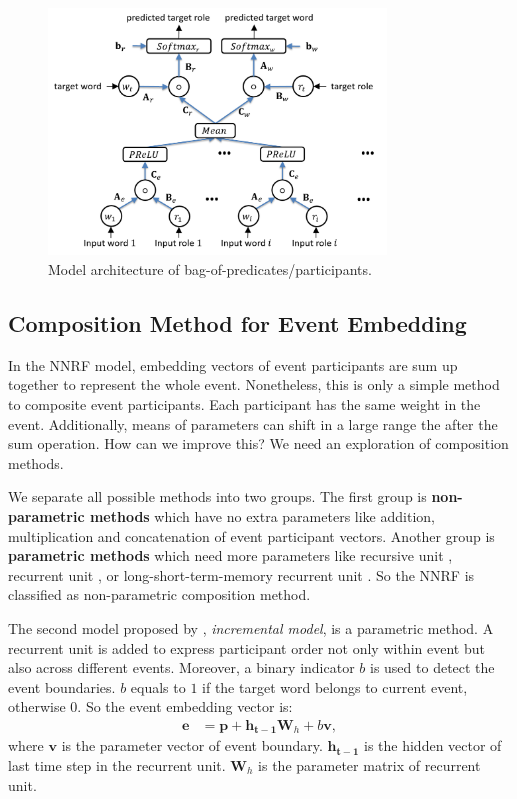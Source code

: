 \documentclass[a4paper]{article}
\begin{document}
\begin{figure}[t]
\centering
\includegraphics[width=0.8\textwidth]{BOP.png}
\caption{\label{fig:BOP} Model architecture of bag-of-predicates/participants.}
\end{figure}


\subsection{Composition Method for Event Embedding} \label{sec:composition}
In the NNRF model, embedding vectors of event participants are sum up together to represent the whole event. Nonetheless, this is only a simple method to composite event participants. Each participant has the same weight in the event. Additionally, means of parameters can shift in a large range the after the sum operation. How can we improve this? We need an exploration of composition methods. 

We separate all possible methods into two groups. The first group is \textbf{non-parametric methods} which have no extra parameters like addition, multiplication and concatenation of event participant vectors. Another group is \textbf{parametric methods} which need more parameters like recursive unit \citep{socher2013recursive}, recurrent unit \citet{mikolov2010recurrent}, or long-short-term-memory recurrent unit \citep{hochreiter1997LSTM}. So the NNRF is classified as non-parametric composition method. 

The second model proposed by \citet{tilk2016event}, \textit{incremental model}, is a parametric method. A recurrent unit is added to express participant order not only within event but also across different events. Moreover, a binary indicator $b$ is used to detect the event boundaries. $b$ equals to $1$ if the target word belongs to current event, otherwise $0$. So the event embedding vector is: 
\begin{equation} \label{eq:incremental}
\begin{aligned}
    \mathbf{e} 
        &= \mathbf{p} + \mathbf{h_{t-1}}\mathbf{W}_h + b\mathbf{v}, 
\end{aligned}
\end{equation}
where $\mathbf{v}$ is the parameter vector of event boundary. $\mathbf{h_{t-1}}$ is the hidden vector of last time step in the recurrent unit. $\mathbf{W}_h$ is the parameter matrix of recurrent unit. 
\end{document}
